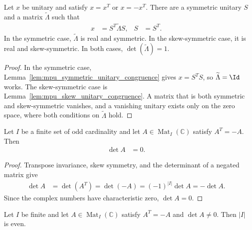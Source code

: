 \begin{lemma}
    \label{lemma:conjclass-normalform-continuous}
    \leanok
    Let $x$ be unitary and satisfy $x=x^T$ or $x=-x^T$. There are a symmetric
    unitary $S$ and a matrix $\widetilde\Lambda$ such that
    \begin{align}
        x & =S^T\widetilde\Lambda S, & S & =S^T.
    \end{align}
    In the symmetric case, $\widetilde\Lambda$ is real and symmetric. In the
    skew-symmetric case, it is real and skew-symmetric. In both cases,
    $\det(\widetilde\Lambda)=1$.
\end{lemma}

\begin{proof}\leanok
    In the symmetric case, Lemma~\ref{lem:mpu_symmetric_unitary_congruence}
    gives $x=S^TS$, so $\widetilde\Lambda=\Id$ works. The skew-symmetric case
    is Lemma~\ref{lem:mpu_skew_unitary_congruence}. A matrix that is both
    symmetric and skew-symmetric vanishes, and a vanishing unitary exists
    only on the zero space, where both conditions on $\widetilde\Lambda$ hold.
\end{proof}

\begin{lemma}
    \label{lem:mpu_skew_symmetric_det_zero}
    \leanok
    Let $I$ be a finite set of odd cardinality and let
    $A\in\operatorname{Mat}_I(\mathbb C)$ satisfy $A^T=-A$. Then
    \begin{align}
        \det A & =0.
    \end{align}
\end{lemma}

\begin{proof}\leanok
    Transpose invariance, skew symmetry, and the determinant of a negated
    matrix give
    \begin{align}
        \det A
         & =\det(A^T)
        =\det(-A)
        =(-1)^{|I|}\det A
        =-\det A.
    \end{align}
    Since the complex numbers have characteristic zero, $\det A=0$.
\end{proof}

\begin{lemma}
    \label{lem:mpu_skew_symmetric_even_card}
    \leanok
    Let $I$ be finite and let $A\in\operatorname{Mat}_I(\mathbb C)$ satisfy
    $A^T=-A$ and $\det A\ne0$. Then $|I|$ is even.
\end{lemma}

